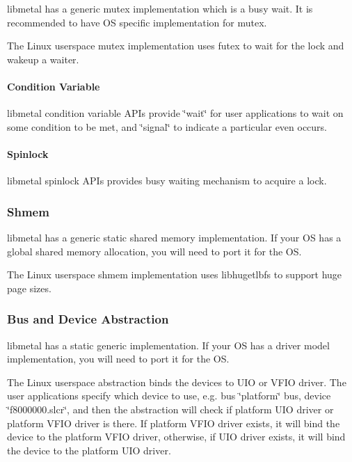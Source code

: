 libmetal has a generic mutex implementation which is a busy wait. It is recommended to have OS specific implementation for mutex.

The Linux userspace mutex implementation uses futex to wait for the lock and wakeup a waiter.

\paragraph*{Condition Variable}

libmetal condition variable A\+P\+Is provide \char`\"{}wait\char`\"{} for user applications to wait on some condition to be met, and \char`\"{}signal\char`\"{} to indicate a particular even occurs.

\paragraph*{Spinlock}

libmetal spinlock A\+P\+Is provides busy waiting mechanism to acquire a lock.

\subsubsection*{Shmem}

libmetal has a generic static shared memory implementation. If your OS has a global shared memory allocation, you will need to port it for the OS.

The Linux userspace shmem implementation uses libhugetlbfs to support huge page sizes.

\subsubsection*{Bus and Device Abstraction}

libmetal has a static generic implementation. If your OS has a driver model implementation, you will need to port it for the OS.

The Linux userspace abstraction binds the devices to U\+IO or V\+F\+IO driver. The user applications specify which device to use, e.\+g. bus \char`\"{}platform\char`\"{} bus, device \char`\"{}f8000000.\+slcr\char`\"{}, and then the abstraction will check if platform U\+IO driver or platform V\+F\+IO driver is there. If platform V\+F\+IO driver exists, it will bind the device to the platform V\+F\+IO driver, otherwise, if U\+IO driver exists, it will bind the device to the platform U\+IO driver.

